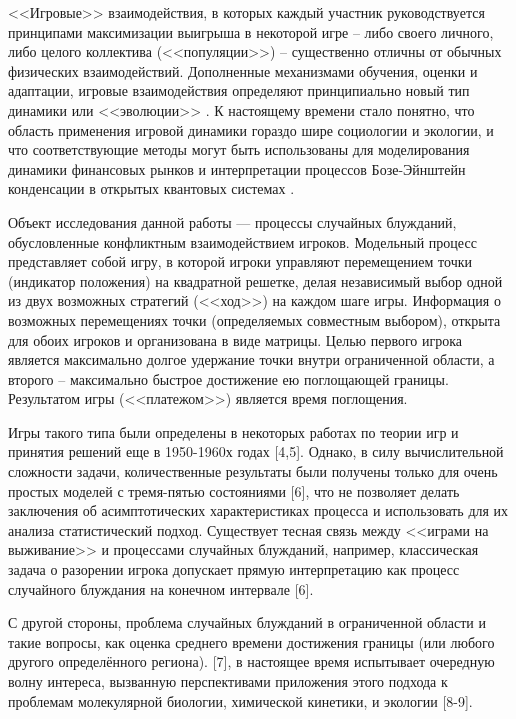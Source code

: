 
{\actuality} <<Игровые>> взаимодействия, в которых каждый участник руководствуется принципами максимизации выигрыша в некоторой игре -- 
либо своего личного, либо целого коллектива (<<популяции>>) – существенно отличны от обычных физических взаимодействий. 
Дополненные механизмами обучения, оценки и адаптации, игровые взаимодействия определяют принципиально новый тип динамики или <<эволюции>> \cite{nowak_evolutionary_2006}. 
К настоящему времени стало понятно, что область применения игровой динамики гораздо шире социологии и экологии, и что соответствующие 
методы могут быть использованы для моделирования динамики финансовых рынков \cite{li_evolutionary_2013} 
и интерпретации процессов Бозе-Эйнштейн конденсации в открытых квантовых системах \cite{knebel_evolutionary_2015}. 

Объект исследования данной работы — процессы случайных блужданий, обусловленные конфликтным взаимодействием игроков. 
Модельный процесс представляет собой игру, в которой игроки управляют перемещением точки (индикатор положения) на квадратной решетке, 
делая независимый выбор одной из двух возможных стратегий (<<ход>>) на каждом шаге игры. Информация о возможных перемещениях точки 
(определяемых совместным выбором), открыта для обоих игроков и организована в виде матрицы. Целью первого игрока является максимально 
долгое удержание точки внутри ограниченной области, а второго -- максимально быстрое достижение ею поглощающей границы. 
Результатом игры (<<платежом>>) является время поглощения. 

Игры такого типа были определены в некоторых работах по теории игр и принятия решений еще в 1950-1960х годах [4,5]. 
Однако, в силу вычислительной сложности задачи, количественные результаты были получены только для очень простых моделей 
с тремя-пятью состояниями [6], что не позволяет делать заключения об асимптотических характеристиках процесса и использовать 
для их анализа статистический подход. Существует тесная связь между <<играми на выживание>> и процессами случайных блужданий, 
например, классическая задача о разорении игрока допускает прямую интерпретацию как процесс случайного блуждания на конечном интервале [6]. 

С другой стороны, проблема случайных блужданий в ограниченной области и такие вопросы, как оценка среднего времени достижения границы 
(или любого другого определённого региона). [7], в настоящее время испытывает очередную волну интереса, вызванную перспективами 
приложения этого подхода к проблемам молекулярной биологии, химической кинетики, и экологии [8-9]. 

